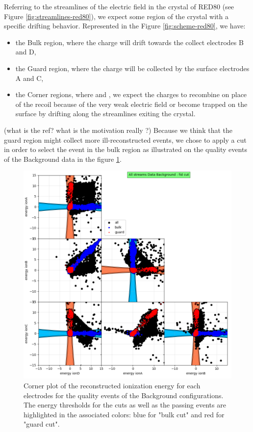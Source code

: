 Referring to the streamlines of the electric field in the crystal of RED80 (see Figure \ref{fig:streamlines-red80}), we expect some region of the crystal with a specific drifting behavior. Represented in the Figure \ref{fig:scheme-red80}, we have:
\begin{itemize}
	\item the Bulk region, where the charge will drift towards the collect electrodes B and D,
	\item the Guard region, where the charge will be collected by the surface electrodes A and C,
	\item the Corner regions, where and , we expect the charges to recombine on place of the recoil because of the very weak electric field or become trapped on the surface by drifting along the streamlines exiting the crystal.
\end{itemize}
{\color{red}(what is the ref? what is the motivation really ?)}
Because we think that the guard region might collect more ill-reconstructed events, we chose to apply a cut in order to select the event in the bulk region as illustrated on the quality events of the Background data in the figure \ref{fig:fiducial-cut}.

\begin{figure}
\centering
\includegraphics[width=\linewidth,]{Figures/Neutron/fid_cut.png}
\caption{Corner plot of the reconstructed ionization energy for each electrodes for the quality events of the Background configurations. The energy thresholds for the cuts as well as the passing events are highlighted in the associated colors: blue for "bulk cut" and red for "guard cut".}
\label{fig:fiducial-cut}
\end{figure}


